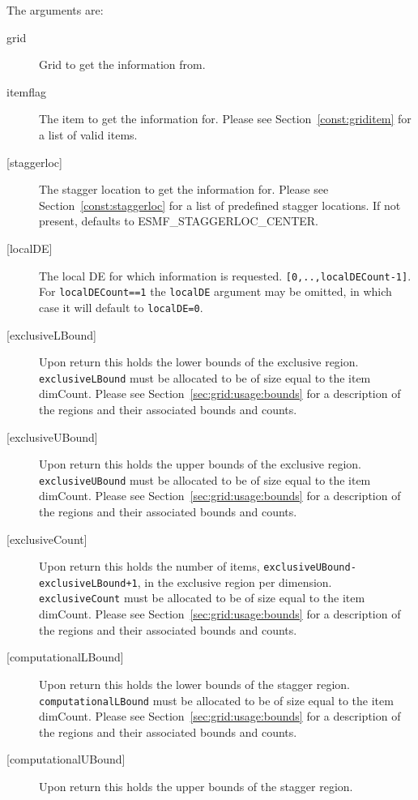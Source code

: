   The arguments are:
  \begin{description}
  \item[grid]
       Grid to get the information from.
  \item[itemflag]
       The item to get the information for. Please see Section~\ref{const:griditem} for a
       list of valid items.
  \item[{[staggerloc]}]
       The stagger location to get the information for.
       Please see Section~\ref{const:staggerloc} for a list
       of predefined stagger locations. If not present, defaults to
       ESMF\_STAGGERLOC\_CENTER.
  \item[{[localDE]}]
            The local DE for which information is requested. {\tt [0,..,localDECount-1]}.
            For {\tt localDECount==1} the {\tt localDE} argument may be omitted,
            in which case it will default to {\tt localDE=0}.
  \item[{[exclusiveLBound]}]
       Upon return this holds the lower bounds of the exclusive region.
       {\tt exclusiveLBound} must be allocated to be of size equal to the item dimCount.
       Please see Section~\ref{sec:grid:usage:bounds} for a description
       of the regions and their associated bounds and counts.
  \item[{[exclusiveUBound]}]
       Upon return this holds the upper bounds of the exclusive region.
       {\tt exclusiveUBound} must be allocated to be of size equal to the item dimCount.
       Please see Section~\ref{sec:grid:usage:bounds} for a description
       of the regions and their associated bounds and counts.
  \item[{[exclusiveCount]}]
       Upon return this holds the number of items, {\tt exclusiveUBound-exclusiveLBound+1},
       in the exclusive region per dimension.
       {\tt exclusiveCount} must
       be allocated to be of size equal to the item dimCount.
       Please see Section~\ref{sec:grid:usage:bounds} for a description
       of the regions and their associated bounds and counts.
  \item[{[computationalLBound]}]
       Upon return this holds the lower bounds of the stagger region.
       {\tt computationalLBound} must be allocated to be of size equal to the item dimCount.
       Please see Section~\ref{sec:grid:usage:bounds} for a description
       of the regions and their associated bounds and counts.
  \item[{[computationalUBound]}]
       Upon return this holds the upper bounds of the stagger region.

\end{description}
